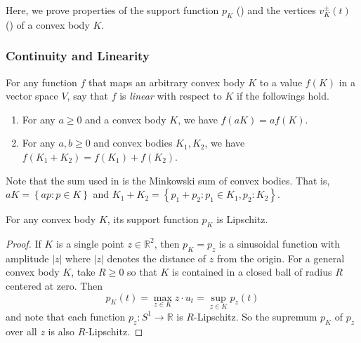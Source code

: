Here, we prove properties of the support function \(p_K\) () and the vertices \(v_K^{\pm}(t)\) () of a convex body \(K\).

\subsubsection{Continuity and Linearity}

\begin{definition}

For any function \(f\) that maps an arbitrary convex body \(K\) to a value \(f(K)\) in a vector space \(V\), say that \(f\) is \emph{linear} with respect to \(K\) if the followings hold.

\begin{enumerate}
\def\labelenumi{\arabic{enumi}.}
\tightlist
\item
  For any \(a \geq 0\) and a convex body \(K\), we have \(f(aK) = a f(K)\).
\item
  For any \(a, b \geq 0\) and convex bodies \(K_1, K_2\), we have \(f(K_1 + K_2) = f(K_1) + f(K_2)\).
\end{enumerate}

\label{def:convex-body-linear}
\end{definition}

Note that the sum used in  is the Minkowski sum of convex bodies. That is, \(aK = \left\{ ap : p \in K \right\}\) and \(K_1 + K_2 = \left\{ p_1 + p_2 : p_1 \in K_1, p_2 : K_2 \right\}\).

\begin{theorem}

For any convex body \(K\), its support function \(p_K\) is Lipschitz.

\label{thm:support-function-lipschitz}
\end{theorem}

\begin{proof}
If \(K\) is a single point \(z \in \mathbb{R}^{2}\), then \(p_K = p_z\) is a sinusoidal function with amplitude \(|z|\) where \(|z|\) denotes the distance of \(z\) from the origin. For a general convex body \(K\), take \(R \geq 0\) so that \(K\) is contained in a closed ball of radius \(R\) centered at zero. Then
\[
p_K(t) = \max_{z \in K} z \cdot u_t = \sup_{z \in K} p_z(t)
\]
and note that each function \(p_z : S^1 \to \mathbb{R}\) is \(R\)-Lipschitz. So the supremum \(p_K\) of \(p_z\) over all \(z\) is also \(R\)-Lipschitz.
\end{proof}

